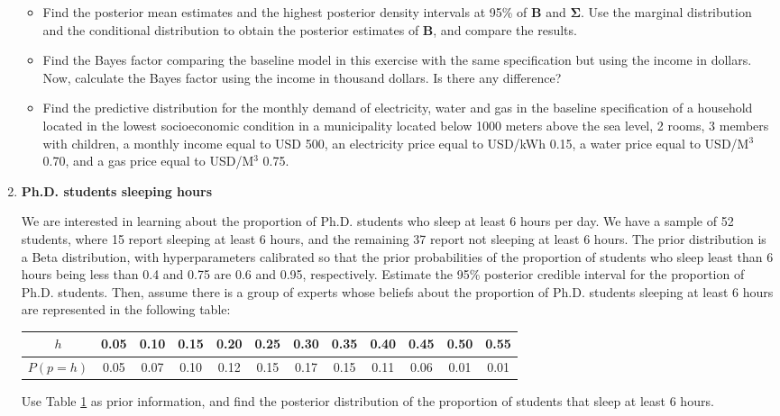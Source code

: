 \begin{enumerate}
\begin{itemize}
	\item Find the posterior mean estimates and the highest posterior density intervals at 95\% of $\bm{B}$ and $\bm{\Sigma}$. Use the marginal distribution and the conditional distribution to obtain the posterior estimates of  $\bm{B}$, and compare the results.
	\item Find the Bayes factor comparing the baseline model in this exercise with the same specification but using the income in dollars. Now, calculate the Bayes factor using the income in thousand dollars. Is there any difference?
	\item Find the predictive distribution for the monthly demand of electricity, water and gas in the baseline specification of a household located in the lowest socioeconomic condition in a municipality located below 1000 meters above the sea level, 2 rooms, 3 members with children, a monthly income equal to USD 500, an electricity price equal to USD/kWh 0.15, a water price equal to USD/M$^3$ 0.70, and a gas price equal to USD/M$^3$ 0.75. 
\end{itemize} 

\item \textbf{Ph.D. students sleeping hours \cite[Chap.~2]{albert2009bayesian}}

We are interested in learning about the proportion of Ph.D. students who sleep at least 6 hours per day. We have a sample of 52 students, where 15 report sleeping at least 6 hours, and the remaining 37 report not sleeping at least 6 hours. The prior distribution is a Beta distribution, with hyperparameters calibrated so that the prior probabilities of the proportion of students who sleep least than 6 hours being less than 0.4 and 0.75 are 0.6 and 0.95, respectively. Estimate the 95\% posterior credible interval for the proportion of Ph.D. students. Then, assume there is a group of experts whose beliefs about the proportion of Ph.D. students sleeping at least 6 hours are represented in the following table:

\begin{table}[!htbp]%
	\label{tab:sleep}%
	\begin{tabular}{cccccccccccc}
		$h$   & 0.05 & 0.10 & 0.15 & 0.20 & 0.25 & 0.30 & 0.35 & 0.40 & 0.45 & 0.50 & 0.55  \\
		\hline
		$P(p=h)$ & 0.05 & 0.07 & 0.10 & 0.12 & 0.15 & 0.17 & 0.15 & 0.11 & 0.06 & 0.01 & 0.01 \\ 

	\end{tabular}
\end{table}
Use Table \ref{tab:sleep} as prior information, and find the posterior distribution of the proportion of students that sleep at least 6 hours. 
	

\end{enumerate}



